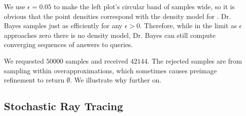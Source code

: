 We use $\epsilon = 0.05$ to make the left plot's circular band of samples wide, so it is obvious that the point densities correspond with the density model for .
Dr. Bayes samples just as efficiently for any $\epsilon > 0$.
Therefore, while in the limit as $\epsilon$ approaches zero there is no density model, Dr. Bayes can still compute converging sequences of answers to queries.

We requested $50000$ samples and received $42144$.
The rejected samples are from sampling within overapproximations, which sometimes causes preimage refinement to return $\emptyset$.
We illustrate why further on.


\subsection{Stochastic Ray Tracing}

